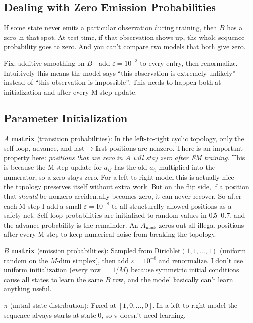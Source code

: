 \documentclass[11pt]{article}
\begin{document}
\subsection{Dealing with Zero Emission Probabilities}

If some state never emits a particular observation during training, then $B$ has a zero in that spot. At test time, if that observation shows up, the whole sequence probability goes to zero. And you can't compare two models that both give zero.

Fix: additive smoothing on $B$---add $\varepsilon = 10^{-8}$ to every entry, then renormalize. Intuitively this means the model says ``this observation is extremely unlikely'' instead of ``this observation is impossible''. This needs to happen both at initialization and after every M-step update.

\subsection{Parameter Initialization}

\textbf{$A$ matrix} (transition probabilities): In the left-to-right cyclic topology, only the self-loop, advance, and last$\to$first positions are nonzero. There is an important property here: \emph{positions that are zero in $A$ will stay zero after EM training}. This is because the M-step update for $a_{ij}$ has the old $a_{ij}$ multiplied into the numerator, so a zero stays zero. For a left-to-right model this is actually nice---the topology preserves itself without extra work. But on the flip side, if a position that \emph{should} be nonzero accidentally becomes zero, it can never recover. So after each M-step I add a small $\varepsilon = 10^{-8}$ to all structurally allowed positions as a safety net. Self-loop probabilities are initialized to random values in 0.5--0.7, and the advance probability is the remainder. An $A_{\text{mask}}$ zeros out all illegal positions after every M-step to keep numerical noise from breaking the topology.

\textbf{$B$ matrix} (emission probabilities): Sampled from $\text{Dirichlet}(1,1,\ldots,1)$ (uniform random on the $M$-dim simplex), then add $\varepsilon = 10^{-8}$ and renormalize. I don't use uniform initialization (every row $= 1/M$) because symmetric initial conditions cause all states to learn the same $B$ row, and the model basically can't learn anything useful.

\textbf{$\pi$} (initial state distribution): Fixed at $[1, 0, \ldots, 0]$. In a left-to-right model the sequence always starts at state 0, so $\pi$ doesn't need learning.
\end{document}

